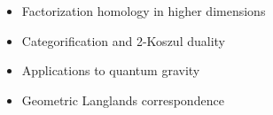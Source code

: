 \begin{remark}
\begin{itemize}
\item Factorization homology in higher dimensions
\item Categorification and 2-Koszul duality
\item Applications to quantum gravity
\item Geometric Langlands correspondence
\end{itemize}
\end{remark}